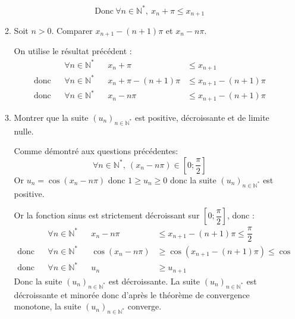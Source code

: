 \documentclass[a4paper,french,bookmarks]{article}
\begin{document}
\begin{enumerate}
\begin{enumerate}
\begin{tcolorbox}[colback=black!3,colframe=black!9,boxrule=.25pt,enhanced,arc is angular,arc=0pt]
        \[ \text{Donc} \ \forall n \in \mathbb{N}^*, \ x_n + \pi \leq x_{n+1}\]
    \end{tcolorbox}
    \item Soit $n > 0$. Comparer $x_{n+1} - (n+1)\pi$ et $x_n - n\pi$.
            \begin{tcolorbox}[colback=black!3,colframe=black!9,boxrule=.25pt,enhanced,arc is angular,arc=0pt]
            On utilise le résultat précédent :
            \begin{align*}
                && \forall n \in \mathbb{N}^* && x_n + \pi &\leq x_{n+1}\\
                \text{donc} && \forall n \in \mathbb{N}^* && x_n + \pi -\left(n+1\right)\pi &\leq x_{n+1} -\left(n+1\right)\pi\\
                 \text{donc} && \forall n \in \mathbb{N}^* && x_n - n\pi &\leq x_{n+1} -\left(n+1\right)\pi
            \end{align*}
    \end{tcolorbox}
    
    \item Montrer que la suite $\left(u_n\right)_{n\in\mathbb{N}^*}$ est positive, décroissante et de limite nulle.
        \begin{tcolorbox}[colback=black!3,colframe=black!9,boxrule=.25pt,enhanced,arc is angular,arc=0pt]
        Comme démontré aux questions précédentes:
        \[ \forall n \in \mathbb{N}^*, \ \left(x_n - n\pi\right) \in \left[0; \dfrac{\pi}{2}\right]\]
        Or $u_n=\cos\left(x_n - n\pi\right)$ donc $1 \geq u_n \geq 0$ donc la suite $\left(u_n\right)_{n\in\mathbb{N}^*}$ est positive.
        
        
        Or la fonction sinus est strictement décroissant sur $\left[0; \dfrac{\pi}{2}\right]$, donc :
        \begin{align*}
            && \forall n \in \mathbb{N}^* && x_n - n\pi &\leq x_{n+1} -\left(n+1\right)\pi \leq \dfrac{\pi}{2}\\
            \text{donc} && \forall n \in \mathbb{N}^* && \cos\left(x_n - n\pi\right) &\geq \cos\left(x_{n+1} -\left(n+1\right)\pi\right) \leq \cos\\
            \text{donc} && \forall n \in \mathbb{N}^* && u_{n} &\geq u_{n+1}
        \end{align*}
        Donc la suite $\left(u_n\right)_{n\in\mathbb{N}^*}$ est décroissante. La suite $\left(u_n\right)_{n\in\mathbb{N}^*}$ est décroissante et minorée donc d'après le théorème de convergence monotone, la suite $\left(u_n\right)_{n\in\mathbb{N}^*}$ converge.\\
               

\end{tcolorbox}
\end{enumerate}
\end{enumerate}
\end{document}
